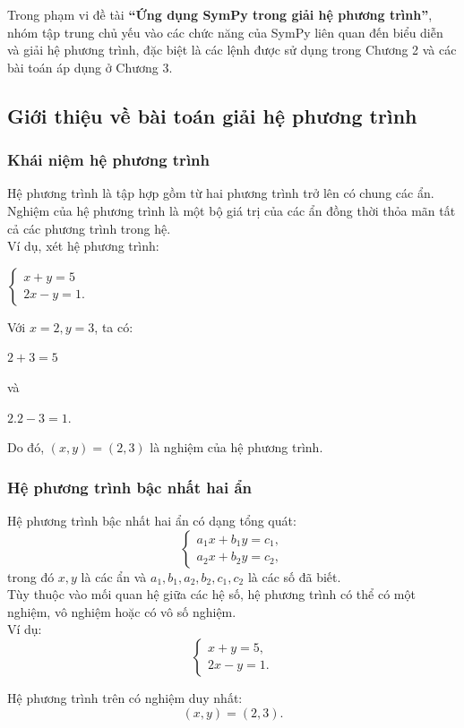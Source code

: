 \documentclass[13pt,a4paper]{article}
\begin{document}
\noindent Trong phạm vi đề tài \textbf{``Ứng dụng SymPy trong giải hệ phương trình''}, nhóm tập trung chủ yếu vào các chức năng của SymPy liên quan đến biểu diễn và giải hệ phương trình, đặc biệt là các lệnh được sử dụng trong Chương 2 và các bài toán áp dụng ở Chương 3.
\subsection{Giới thiệu về bài toán giải hệ phương trình}
\subsubsection{Khái niệm hệ phương trình}
Hệ phương trình là tập hợp gồm từ hai phương trình trở lên có chung các ẩn. Nghiệm của hệ phương trình là một bộ giá trị của các ẩn đồng thời thỏa mãn tất cả các phương trình trong hệ.\\
\noindent Ví dụ, xét hệ phương trình:
\begin{center}
    $\begin{cases}
    x + y = 5 \\
    2x - y = 1.
\end{cases}$
\end{center}
Với $x=2,y=3$, ta có:
\begin{center}
    $2+3=5$
\end{center}
và
\begin{center}
    $2.2-3=1.$
\end{center}
Do đó, $(x,y)=(2,3)$ là nghiệm của hệ phương trình.
\subsubsection{Hệ phương trình bậc nhất hai ẩn}
Hệ phương trình bậc nhất hai ẩn có dạng tổng quát:
\[
\begin{cases}
    a_1x + b_1y = c_1, \\
    a_2x + b_2y = c_2,
\end{cases}
\]
trong đó $x, y$ là các ẩn và $a_1, b_1, a_2, b_2, c_1, c_2$ là các số đã biết.\\
\noindent Tùy thuộc vào mối quan hệ giữa các hệ số, hệ phương trình có thể có một nghiệm, vô nghiệm hoặc có vô số nghiệm.\\
\noindent Ví dụ:
\[
\begin{cases}
    x + y = 5, \\
    2x - y = 1.
\end{cases}
\]

\noindent Hệ phương trình trên có nghiệm duy nhất:
\[
(x, y) = (2, 3).
\]
\end{document}
